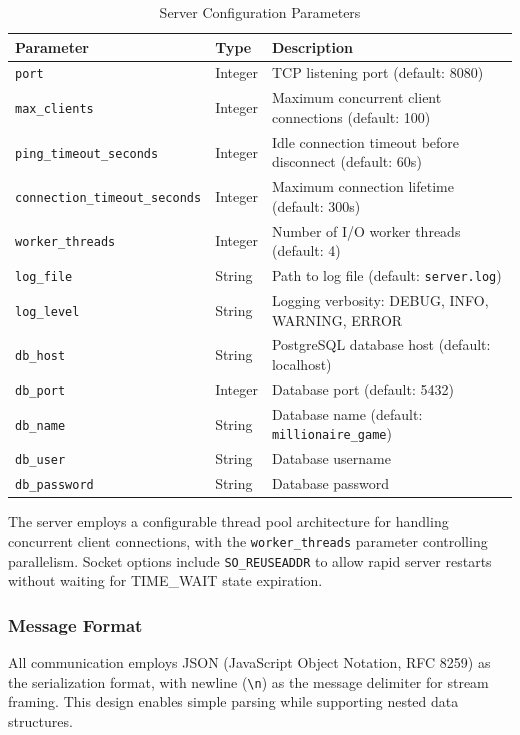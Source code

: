 \begin{table}[h]
\centering
\caption{Server Configuration Parameters}
\label{tab:server_config}
\small
\begin{tabular}{|l|l|p{5.5cm}|}
\hline
\textbf{Parameter} & \textbf{Type} & \textbf{Description} \\
\hline
\texttt{port} & Integer & TCP listening port (default: 8080) \\
\hline
\texttt{max\_clients} & Integer & Maximum concurrent client connections (default: 100) \\
\hline
\texttt{ping\_timeout\_seconds} & Integer & Idle connection timeout before disconnect (default: 60s) \\
\hline
\texttt{connection\_timeout\_seconds} & Integer & Maximum connection lifetime (default: 300s) \\
\hline
\texttt{worker\_threads} & Integer & Number of I/O worker threads (default: 4) \\
\hline
\texttt{log\_file} & String & Path to log file (default: \texttt{server.log}) \\
\hline
\texttt{log\_level} & String & Logging verbosity: DEBUG, INFO, WARNING, ERROR \\
\hline
\texttt{db\_host} & String & PostgreSQL database host (default: localhost) \\
\hline
\texttt{db\_port} & Integer & Database port (default: 5432) \\
\hline
\texttt{db\_name} & String & Database name (default: \texttt{millionaire\_game}) \\
\hline
\texttt{db\_user} & String & Database username \\
\hline
\texttt{db\_password} & String & Database password \\
\hline
\end{tabular}
\end{table}

The server employs a configurable thread pool architecture for handling concurrent client connections, with the \texttt{worker\_threads} parameter controlling parallelism. Socket options include \texttt{SO\_REUSEADDR} to allow rapid server restarts without waiting for TIME\_WAIT state expiration.

\subsubsection{Message Format}

All communication employs JSON (JavaScript Object Notation, RFC 8259) as the serialization format, with newline (\texttt{\textbackslash n}) as the message delimiter for stream framing. This design enables simple parsing while supporting nested data structures.

